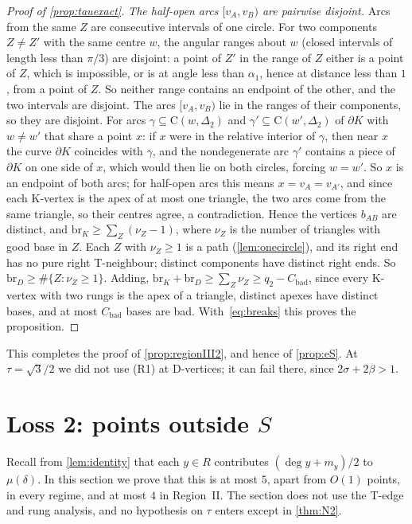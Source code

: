 \documentclass[11pt]{amsart}
\theoremstyle{definition}
\theoremstyle{remark}
\newcommand{\Dt}{\Delta_2}
\newcommand{\mult}{\mu}
\newcommand{\Cc}{\mathrm{C}}      %
\begin{document}
\begin{proof}[Proof of \cref{prop:tauexact}]
\emph{The half-open arcs $[v_A,v_B)$ are pairwise disjoint.} Arcs from the same $Z$ are consecutive intervals of one circle. For two components $Z\ne Z'$ with the same centre $w$, the angular ranges about $w$ (closed intervals of length less than $\pi/3$) are disjoint: a point of $Z'$ in the range of $Z$ either is a point of $Z$, which is impossible, or is at angle less than $\alpha_1$, hence at distance less than $1$, from a point of $Z$. So neither range contains an endpoint of the other, and the two intervals are disjoint. The arcs $[v_A,v_B)$ lie in the ranges of their components, so they are disjoint. For arcs $\gamma\subseteq\Cc(w,\Dt)$ and $\gamma'\subseteq\Cc(w',\Dt)$ of $\partial K$ with $w\ne w'$ that share a point $x$: if $x$ were in the relative interior of $\gamma$, then near $x$ the curve $\partial K$ coincides with $\gamma$, and the nondegenerate arc $\gamma'$ contains a piece of $\partial K$ on one side of $x$, which would then lie on both circles, forcing $w=w'$. So $x$ is an endpoint of both arcs; for half-open arcs this means $x=v_A=v_{A'}$, and since each K-vertex is the apex of at most one triangle, the two arcs come from the same triangle, so their centres agree, a contradiction.
Hence the vertices $b_{AB}$ are distinct, and $\mathrm{br}_K\ge\sum_Z(\nu_Z-1)$, where $\nu_Z$ is the number of triangles with good base in $Z$. Each $Z$ with $\nu_Z\ge1$ is a path (\cref{lem:onecircle}), and its right end has no pure right T-neighbour; distinct components have distinct right ends. So $\mathrm{br}_D\ge\#\{Z:\nu_Z\ge1\}$. Adding, $\mathrm{br}_K+\mathrm{br}_D\ge\sum_Z\nu_Z\ge q_2-C_{\mathrm{bad}}$, since every K-vertex with two rungs is the apex of a triangle, distinct apexes have distinct bases, and at most $C_{\mathrm{bad}}$ bases are bad. With~\eqref{eq:breaks} this proves the proposition.
\end{proof}

This completes the proof of \cref{prop:regionIII2}, and hence of \cref{prop:eS}. At $\tau=\sqrt3/2$ we did not use (R1) at D-vertices; it can fail there, since $2\sigma+2\beta>1$.

\section{Loss 2: points outside \texorpdfstring{$S$}{S}}\label{sec:loss2}

Recall from \cref{lem:identity} that each $y\in R$ contributes $(\deg y+m_y)/2$ to $\mult(\delta)$. In this section we prove that this is at most $5$, apart from $O(1)$ points, in every regime, and at most $4$ in Region~II. The section does not use the T-edge and rung analysis, and no hypothesis on $\tau$ enters except in \cref{thm:N2}.
\end{document}
